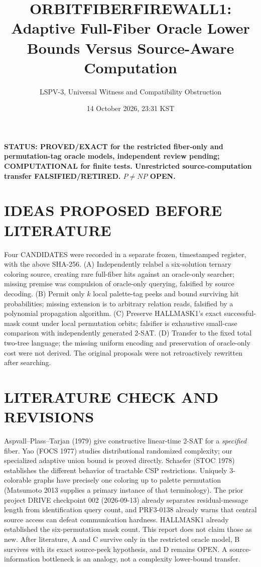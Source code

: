 \documentclass[11pt]{article}
\title{ORBITFIBERFIREWALL1: Adaptive Full-Fiber Oracle Lower Bounds Versus Source-Aware Computation}
\author{LSPV-3, Universal Witness and Compatibility Obstruction}
\date{14 October 2026, 23:31 KST}
\begin{document}
\maketitle
\noindent\textbf{STATUS: PROVED/EXACT for the restricted fiber-only and permutation-tag oracle models, independent review pending; COMPUTATIONAL for finite tests. Unrestricted source-computation transfer FALSIFIED/RETIRED. $P\ne NP$ OPEN.}

\section{IDEAS PROPOSED BEFORE LITERATURE}
Four CANDIDATES were recorded in a separate frozen, timestamped register, with the above SHA-256. (A) Independently relabel a six-solution ternary coloring source, creating rare full-fiber hits against an oracle-only searcher; missing premise was compulsion of oracle-only querying, falsified by source decoding. (B) Permit only $k$ local palette-tag peeks and bound surviving hit probabilities; missing extension is to arbitrary relation reads, falsified by a polynomial propagation algorithm. (C) Preserve HALLMASK1's exact successful-mask count under local permutation orbits; falsifier is exhaustive small-case comparison with independently generated 2-SAT. (D) Transfer to the fixed total two-tree language; the missing uniform encoding and preservation of oracle-only cost were not derived. The original proposals were not retroactively rewritten after searching.

\section{LITERATURE CHECK AND REVISIONS}
Aspvall--Plass--Tarjan (1979) give constructive linear-time 2-SAT for a \emph{specified} fiber. Yao (FOCS 1977) studies distributional randomized complexity; our specialized adaptive union bound is proved directly. Schaefer (STOC 1978) establishes the different behavior of tractable CSP restrictions. Uniquely 3-colorable graphs have precisely one coloring up to palette permutation (Matsumoto 2013 supplies a primary instance of that terminology). The prior project DRIVE checkpoint 002 (2026-09-13) already separates residual-message length from identification query count, and PRF3-0138 already warns that central source access can defeat communication hardness. HALLMASK1 already established the six-permutation mask count. This report does not claim those as new. After literature, A and C survive only in the restricted oracle model, B survives with its exact source-peek hypothesis, and D remains OPEN. A source-information bottleneck is an analogy, not a complexity lower-bound transfer.
\end{document}
